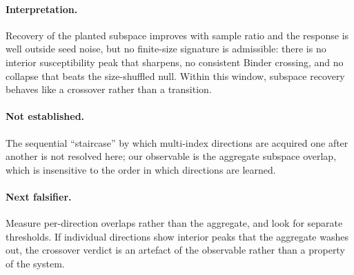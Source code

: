 \paragraph{Interpretation.}
Recovery of the planted subspace improves with sample ratio and the response is
well outside seed noise, but no finite-size signature is admissible: there is no
interior susceptibility peak that sharpens, no consistent Binder crossing, and
no collapse that beats the size-shuffled null. Within this window, subspace
recovery behaves like a crossover rather than a transition.

\paragraph{Not established.}
The sequential ``staircase'' by which multi-index directions are acquired one
after another is not resolved here; our observable is the aggregate subspace
overlap, which is insensitive to the order in which directions are learned.

\paragraph{Next falsifier.}
Measure per-direction overlaps rather than the aggregate, and look for
separate thresholds. If individual directions show interior peaks that the
aggregate washes out, the crossover verdict is an artefact of the observable
rather than a property of the system.
